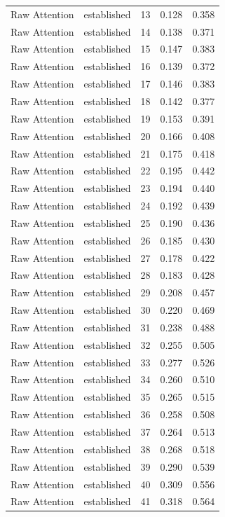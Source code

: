 \begin{tabular}{llrrr}
Raw Attention & established & 13 & 0.128 & 0.358 \\
Raw Attention & established & 14 & 0.138 & 0.371 \\
Raw Attention & established & 15 & 0.147 & 0.383 \\
Raw Attention & established & 16 & 0.139 & 0.372 \\
Raw Attention & established & 17 & 0.146 & 0.383 \\
Raw Attention & established & 18 & 0.142 & 0.377 \\
Raw Attention & established & 19 & 0.153 & 0.391 \\
Raw Attention & established & 20 & 0.166 & 0.408 \\
Raw Attention & established & 21 & 0.175 & 0.418 \\
Raw Attention & established & 22 & 0.195 & 0.442 \\
Raw Attention & established & 23 & 0.194 & 0.440 \\
Raw Attention & established & 24 & 0.192 & 0.439 \\
Raw Attention & established & 25 & 0.190 & 0.436 \\
Raw Attention & established & 26 & 0.185 & 0.430 \\
Raw Attention & established & 27 & 0.178 & 0.422 \\
Raw Attention & established & 28 & 0.183 & 0.428 \\
Raw Attention & established & 29 & 0.208 & 0.457 \\
Raw Attention & established & 30 & 0.220 & 0.469 \\
Raw Attention & established & 31 & 0.238 & 0.488 \\
Raw Attention & established & 32 & 0.255 & 0.505 \\
Raw Attention & established & 33 & 0.277 & 0.526 \\
Raw Attention & established & 34 & 0.260 & 0.510 \\
Raw Attention & established & 35 & 0.265 & 0.515 \\
Raw Attention & established & 36 & 0.258 & 0.508 \\
Raw Attention & established & 37 & 0.264 & 0.513 \\
Raw Attention & established & 38 & 0.268 & 0.518 \\
Raw Attention & established & 39 & 0.290 & 0.539 \\
Raw Attention & established & 40 & 0.309 & 0.556 \\
Raw Attention & established & 41 & 0.318 & 0.564 \\

\end{tabular}
